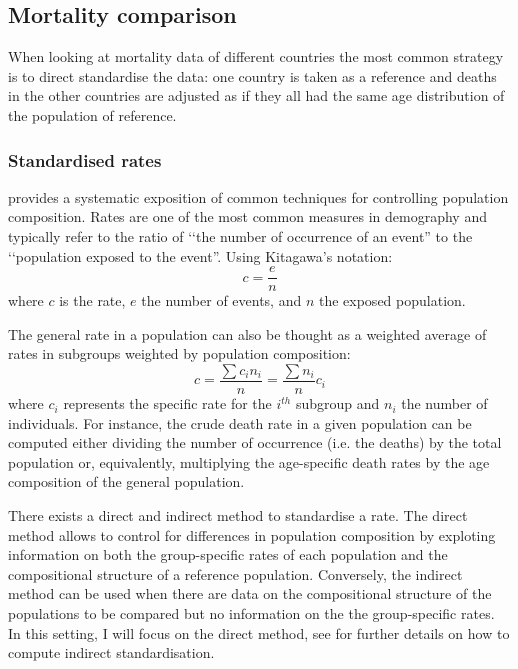 \documentclass[../main.tex]{subfiles}
\begin{document}
\subsection{Mortality comparison}
When looking at mortality data of different countries the most common strategy is to direct standardise the data: one country is taken as a reference and deaths in the other countries are adjusted as if they all had the same age distribution of the population of reference.

\subsubsection{Standardised rates}
\cite{Kitagawa1964} provides a systematic exposition of common techniques for controlling population composition. Rates are one of the most common measures in demography and typically refer to the ratio of \lq\lq the number of occurrence of an event'' to the \lq\lq population exposed to the event''. Using Kitagawa's notation:
\begin{equation}
    c = \frac{e}{n}
\end{equation}
where $c$ is the rate, $e$ the number of events, and $n$ the exposed population.

The general rate in a  population can also be thought as a weighted average of rates in subgroups weighted by population composition:
\begin{equation}
    c = \frac{\sum  c_i n_i}{n} = \frac{\sum n_i}{n} c_i
\end{equation}
where $c_i$ represents the specific rate for the $i^{th}$ subgroup and $n_i$ the number of individuals. For instance, the crude death rate in a given population can be computed either dividing the number of occurrence (i.e. the deaths) by the total population or, equivalently, multiplying the age-specific death rates by the age composition of the general population. 

There exists a direct and indirect method to standardise a rate.
The direct method allows to control for differences in population composition by exploting information on both the group-specific rates of each population and the compositional structure of a reference population. Conversely, the indirect method can be used when there are data on the compositional structure of the populations to be compared but no 
information on the the group-specific rates. In this setting, I will focus on the direct method, see \cite{Kitagawa1964} for further details on how to compute indirect standardisation.
\end{document}

